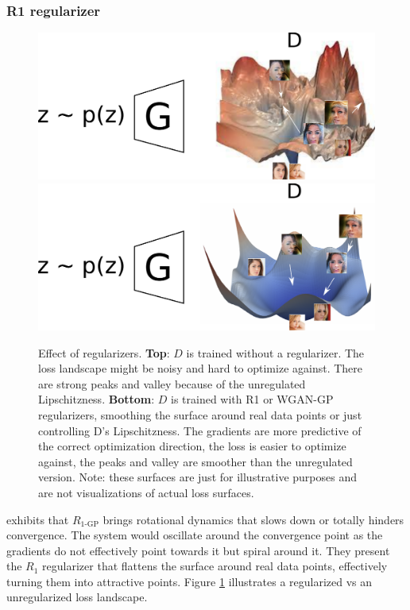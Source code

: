 \subsubsection{R1 regularizer}

\begin{figure}[ht]
    \centering
    \includegraphics[scale=0.6]{60-files/gan-as-loss-bad.pdf}
    \includegraphics[scale=0.6]{60-files/gan-as-loss.pdf}
    \caption{Effect of regularizers. \textbf{Top}: $D$ is trained without a regularizer. The loss landscape might be noisy and hard to optimize against. There are strong peaks and valley because of the unregulated Lipschitzness. \textbf{Bottom}: $D$ is trained with R1 or \ac{WGAN-GP} regularizers, smoothing the surface around real data points or just controlling D's Lipschitzness. The gradients are more predictive of the correct optimization direction, the loss is easier to optimize against, the peaks and valley are smoother than the unregulated version. Note: these surfaces are just for illustrative purposes and are not visualizations of actual loss surfaces.}
    \label{fig:gan-lipschitz}
\end{figure}

\citet{R1}  exhibits that $R_\text{1-GP}$ brings rotational dynamics that slows down or totally hinders convergence. The system would oscillate around the convergence point as the gradients do not effectively point towards it but spiral around it. They present the $R_1$ regularizer that flattens the surface around real data points, effectively turning them into attractive points. Figure \ref{fig:gan-lipschitz} illustrates a regularized vs an unregularized loss landscape.

